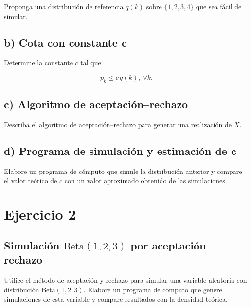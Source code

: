 \documentclass[10pt,a4paper]{article}
\let\le\leqslant
\let\leq\leqslant
\let\le\leq
\let\oldsection\section
\renewcommand{\section}{%
      \clearpage
      \thispagestyle{myfancy}%
      \oldsection
    }
\begin{document}
    Proponga una distribución de referencia \(q(k)\) sobre
\(\{1, 2, 3, 4\}\) que sea fácil de simular.

    \hypertarget{b-cota-con-constante-c}{%
\subsection{b) Cota con constante c}\label{b-cota-con-constante-c}}

    Determine la constante \(c\) tal que

\[
p_k \le c\, q(k),\ \forall k.
\]

    \hypertarget{c-algoritmo-de-aceptaciuxf3nrechazo}{%
\subsection{c) Algoritmo de
aceptación--rechazo}\label{c-algoritmo-de-aceptaciuxf3nrechazo}}

    Describa el algoritmo de aceptación--rechazo para generar una
realización de \(X\).

    \hypertarget{d-programa-de-simulaciuxf3n-y-estimaciuxf3n-de-c}{%
\subsection{d) Programa de simulación y estimación de
c}\label{d-programa-de-simulaciuxf3n-y-estimaciuxf3n-de-c}}

    Elabore un programa de cómputo que simule la distribución anterior y
compare el valor teórico de \(c\) con un valor aproximado obtenido de
las simulaciones.

    \hypertarget{ejercicio-2}{%
\section{Ejercicio 2}\label{ejercicio-2}}

    \hypertarget{simulaciuxf3n-textbeta1-23-por-aceptaciuxf3nrechazo}{%
\subsection{\texorpdfstring{Simulación \(\text{Beta}(1, 2,3)\) por
aceptación--rechazo}{Simulación \textbackslash text\{Beta\}(1, 2,3) por aceptación--rechazo}}\label{simulaciuxf3n-textbeta1-23-por-aceptaciuxf3nrechazo}}

    Utilice el método de aceptación y rechazo para simular una variable
aleatoria con distribución \(\text{Beta}(1, 2,3)\). Elabore un programa
de cómputo que genere simulaciones de esta variable y compare resultados
con la densidad teórica.
\end{document}
